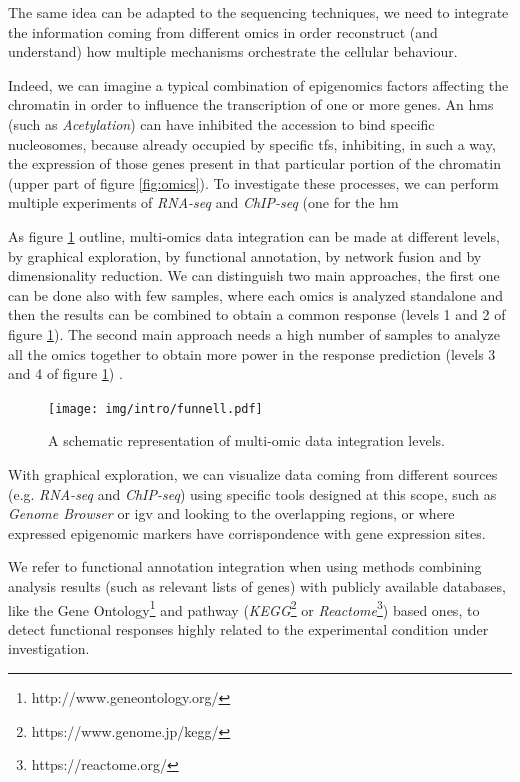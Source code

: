 The same idea can be adapted to the sequencing techniques, we need to integrate the information coming from different omics in order reconstruct (and understand) how multiple mechanisms orchestrate the cellular behaviour.

Indeed, we can imagine a typical combination of epigenomics factors affecting the chromatin in order to influence the transcription of one or more genes.
An \glspl{hm} (such as \textit{Acetylation}) can have inhibited the accession to bind specific nucleosomes, because already occupied by specific \glspl{tf}, inhibiting, in such a way, the expression of those genes present in that particular portion of the chromatin (upper part of figure \ref{fig:omics}).
To investigate these processes, we can perform multiple experiments of \textit{RNA-seq} and \textit{ChIP-seq} (one for the \gls{hm}

As figure \ref{fig:funnell} outline, multi-omics data integration can be made at different levels, by graphical exploration, by functional annotation, by network fusion and by dimensionality reduction.
We can distinguish two main approaches, the first one can be done also with few samples, where each omics is analyzed standalone and then the results can be combined to obtain a common response (levels 1 and 2 of figure \ref{fig:funnell}).
The second main approach needs a high number of samples to analyze all the omics together to obtain more power in the response prediction (levels 3 and 4 of figure \ref{fig:funnell}) \cite{Rohart2017, Argelaguet2018, Jia2017, Meng2016}.

\begin{figure}[h]
\centering
\texttt{[image: img/intro/funnell.pdf]}
\caption[Integration Funnell]{A schematic representation of multi-omic data integration levels.}
\label{fig:funnell}
\end{figure}

With graphical exploration, we can visualize data coming from different sources (e.g. \textit{RNA-seq} and \textit{ChIP-seq}) using specific tools designed at this scope, such as \textit{Genome Browser} \cite{Karolchik2011} or \gls{igv} \cite{Robinson2011, Thorvaldsdottir2013} and looking to the overlapping regions, or where expressed epigenomic markers have corrispondence with gene expression sites.

We refer to functional annotation integration when using methods combining analysis results (such as relevant lists of genes) with publicly available databases,  like the Gene Ontology\footnote{http://www.geneontology.org/} and pathway (\textit{KEGG}\footnote{https://www.genome.jp/kegg/} or \textit{Reactome}\footnote{https://reactome.org/}) based ones, to detect functional responses highly related to the experimental condition under investigation.

